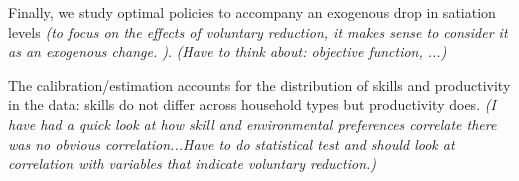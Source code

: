 \documentclass[12pt]{article}
\begin{document}
Finally, we study optimal policies to accompany an exogenous drop in satiation levels \textit{(to focus on the effects of voluntary reduction, it makes sense to consider it as an exogenous change. )}. \textit{(Have to think about: objective function, ...)}

The calibration/estimation accounts for the distribution of skills and productivity in the data: skills do not differ across household types but productivity does. \textit{(I have had a quick look at how skill and environmental preferences correlate there was no obvious correlation...Have to do statistical test and should look at correlation with variables that indicate voluntary reduction.)} 




\end{document}
